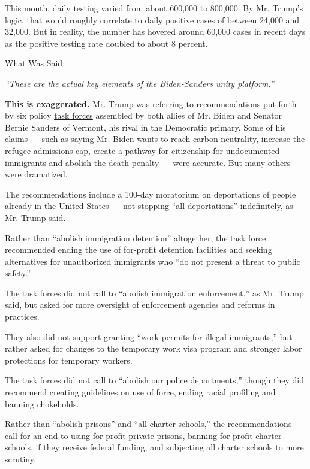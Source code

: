 This month, daily testing varied from about 600,000 to 800,000. By Mr.
Trump's logic, that would roughly correlate to daily positive cases of
between 24,000 and 32,000. But in reality, the number has hovered around
60,000 cases in recent days as the positive testing rate doubled to
about 8 percent.

What Was Said

\emph{``These are the actual key elements of the Biden-Sanders unity
platform.''}

\textbf{This is exaggerated.} Mr. Trump was referring to
\href{https://joebiden.com/wp-content/uploads/2020/07/UNITY-TASK-FORCE-RECOMMENDATIONS.pdf}{recommendations}
put forth by six policy
\href{https://www.nytimes3xbfgragh.onion/2020/07/08/us/politics/biden-bernie-sanders.html}{task
forces} assembled by both allies of Mr. Biden and Senator Bernie Sanders
of Vermont, his rival in the Democratic primary. Some of his claims ---
such as saying Mr. Biden wants to reach carbon-neutrality, increase the
refugee admissions cap, create a pathway for citizenship for
undocumented immigrants and abolish the death penalty --- were accurate.
But many others were dramatized.

The recommendations include a 100-day moratorium on deportations of
people already in the United States --- not stopping ``all
deportations'' indefinitely, as Mr. Trump said.

Rather than ``abolish immigration detention'' altogether, the task force
recommended ending the use of for-profit detention facilities and
seeking alternatives for unauthorized immigrants who ``do not present a
threat to public safety.''

The task forces did not call to ``abolish immigration enforcement,'' as
Mr. Trump said, but asked for more oversight of enforcement agencies and
reforms in practices.

They also did not support granting ``work permits for illegal
immigrants,'' but rather asked for changes to the temporary work visa
program and stronger labor protections for temporary workers.

The task forces did not call to ``abolish our police departments,''
though they did recommend creating guidelines on use of force, ending
racial profiling and banning chokeholds.

Rather than ``abolish prisons'' and ``all charter schools,'' the
recommendations call for an end to using for-profit private prisons,
banning for-profit charter schools, if they receive federal funding, and
subjecting all charter schools to more scrutiny.

